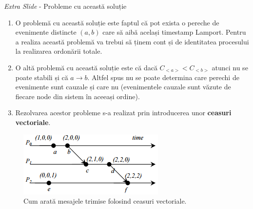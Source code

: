\documentclass[9pt]{beamer}
\begin{document}
\begin{frame}{\textit{Extra Slide} - Probleme cu această soluție}
\begin{enumerate}
    \item O problemă cu această soluție este faptul că pot exista o pereche de evenimente distincte $(a,b)$ care să aibă același timestamp Lamport. Pentru a realiza această problemă va trebui să ținem cont și de identitatea procesului la realizarea ordonării totale.
    \vskip5pt
    \item O altă problemă cu această soluție este că dacă $C_{<a>} < C_{<b>}$ atunci nu se poate stabili și că $a \rightarrow b$. Altfel spus nu se poate determina care perechi de evenimente sunt cauzale și care nu (evenimentele cauzale sunt văzute de fiecare node din sistem în aceeași ordine).
    \vskip5pt
    \item Rezolvarea acestor probleme s-a realizat prin introducerea unor \textbf{ceasuri vectoriale}.
\end{enumerate}
\centering
\begin{figure}
    \includegraphics[scale=0.5]{figures/vector}
    \caption{Cum arată mesajele trimise folosind ceasuri vectoriale.}
\end{figure}
\end{frame}
\end{document}
